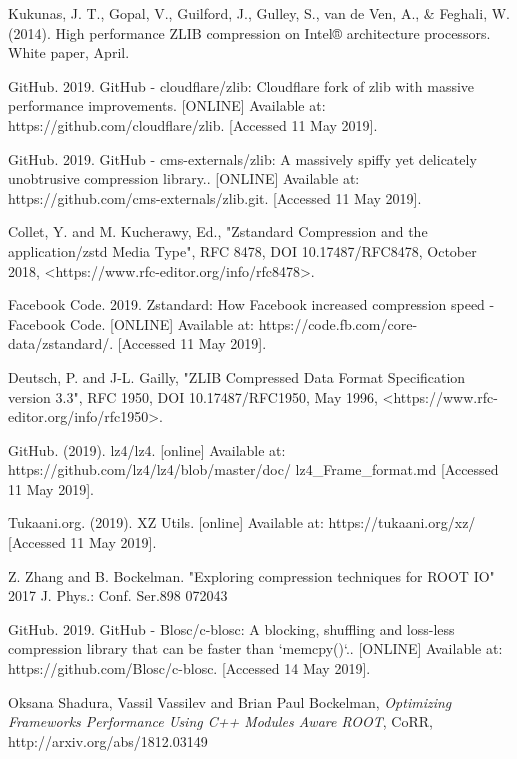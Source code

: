 \documentclass[12pt]{iopart}
\begin{document}
\begin{thebibliography}{10}
Kukunas, J. T., Gopal, V., Guilford, J., Gulley, S., van de Ven, A., \& Feghali, W. (2014). High performance ZLIB compression on Intel® architecture processors. White paper, April.

GitHub. 2019. GitHub - cloudflare/zlib: Cloudflare fork of zlib with massive performance improvements. [ONLINE] Available at: https://github.com/cloudflare/zlib. [Accessed 11 May 2019]. 

GitHub. 2019. GitHub - cms-externals/zlib: A massively spiffy yet delicately unobtrusive compression library.. [ONLINE] Available at: https://github.com/cms-externals/zlib.git. [Accessed 11 May 2019]. 

Collet, Y. and M. Kucherawy, Ed., "Zstandard Compression and the application/zstd Media Type", RFC 8478, DOI 10.17487/RFC8478, October 2018, <https://www.rfc-editor.org/info/rfc8478>.

Facebook Code. 2019. Zstandard: How Facebook increased compression speed - Facebook Code. [ONLINE] Available at: https://code.fb.com/core-data/zstandard/. [Accessed 11 May 2019]. 

Deutsch, P. and J-L. Gailly, "ZLIB Compressed Data Format Specification version 3.3", RFC 1950, DOI 10.17487/RFC1950, May 1996, <https://www.rfc-editor.org/info/rfc1950>.

GitHub. (2019). lz4/lz4. [online] Available at: https://github.com/lz4/lz4/blob/master/doc/
lz4\_Frame\_format.md [Accessed 11 May 2019].

Tukaani.org. (2019). XZ Utils. [online] Available at: https://tukaani.org/xz/ [Accessed 11 May 2019].

Z. Zhang and B. Bockelman. "Exploring compression techniques for ROOT IO" 2017 J. Phys.: Conf. Ser.898 072043

GitHub. 2019. GitHub - Blosc/c-blosc: A blocking, shuffling and loss-less compression library that can be faster than `memcpy()`.. [ONLINE] Available at: https://github.com/Blosc/c-blosc. [Accessed 14 May 2019]. 

Oksana Shadura, Vassil Vassilev and Brian Paul Bockelman, \textit{Optimizing Frameworks Performance Using C++ Modules Aware ROOT}, CoRR, http://arxiv.org/abs/1812.03149

\end{thebibliography}
\end{document}
